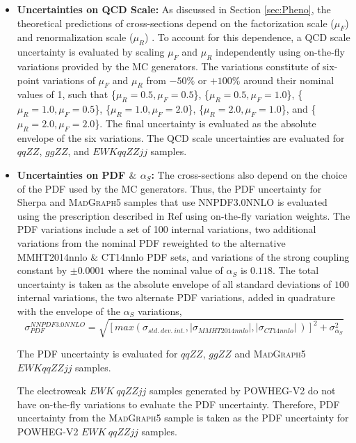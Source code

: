 \begin{itemize}
\item{\textbf{Uncertainties on QCD Scale:} As discussed in Section \ref{sec:Pheno}, the theoretical predictions of cross-sections depend on the factorization scale ($\mu_{F}$) and renormalization scale ($\mu_{R}$) \cite{QCDScaleAndPDFUnc}. To account for this dependence, a QCD scale uncertainty is evaluated by scaling $\mu_{F}$ and $\mu_{R}$ independently using on-the-fly variations provided by the MC generators. The variations constitute of six-point variations of $\mu_{F}$ and $\mu_{R}$ from $-50\%$ or $+100\%$ around their nominal values of 1, such that \{$\mu_R = 0.5, \mu_F = 0.5$\}, \{$\mu_R = 0.5, \mu_F = 1.0$\}, \{$\mu_R = 1.0, \mu_F = 0.5$\}, \{$\mu_R = 1.0, \mu_F = 2.0$\}, \{$\mu_R = 2.0, \mu_F = 1.0$\}, and \{$\mu_R = 2.0, \mu_F = 2.0$\}. The final uncertainty is evaluated as the absolute envelope of the six variations. The QCD scale uncertainties are evaluated for $qqZZ$, $ggZZ$, and $EWK qqZZjj$ samples.
}
\item{\textbf{Uncertainties on PDF $\&$ $\alpha_{S}$:} The cross-sections also depend on the choice of the PDF used by the MC generators. Thus, the PDF uncertainty for Sherpa and \textsc{MadGraph5} samples that use NNPDF3.0NNLO is evaluated using the prescription described in Ref \cite{PDFForRunII} using on-the-fly variation weights. The PDF variations include a set of 100 internal variations, two additional variations from the nominal PDF reweighted to the alternative MMHT2014nnlo \cite{MMHT2014PDFs} $\&$ CT14nnlo \cite{CT14nnlo} PDF sets, and variations of the strong coupling constant by $\pm0.0001$ where the nominal value of $\alpha_{S}$ is $0.118$. The total uncertainty is taken as the absolute envelope of all standard deviations of $100$ internal variations, the two alternate PDF variations, added in quadrature with the envelope of the $\alpha_{S}$ variations, 
\begin{equation}
    \sigma_{PDF}^{NNPDF3.0NNLO} = \sqrt{ [ max (\sigma_{std.~dev.~int.}, |\sigma_{MMHT2014nnlo}| , |\sigma_{CT14nnlo}|~)]^2 + \sigma_{\alpha_S}^2 }
\end{equation}

The PDF uncertainty is evaluated for $qqZZ$, $ggZZ$ and \textsc{MadGraph5} $EWK qqZZjj$ samples.

The electroweak $EWK~qqZZjj$ samples generated by \textsc{POWHEG-V2} do not have on-the-fly variations to evaluate the PDF uncertainty. Therefore, PDF uncertainty from the \textsc{MadGraph5} sample is taken as the PDF uncertainty for \textsc{POWHEG-V2} $EWK~qqZZjj$ samples.
}


\end{itemize}
